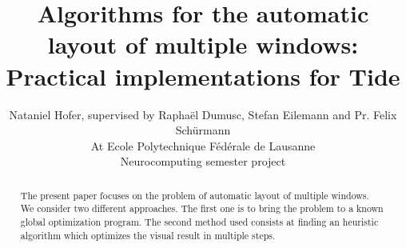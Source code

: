 \documentclass{acmtog}
\begin{document}
\makeatletter
\def\runningfoot{\def\@runningfoot{}}
\def\firstfoot{\def\@firstfoot{}}
\makeatother



\title{Algorithms for the automatic layout of multiple windows: \\Practical implementations for Tide}

\author{Nataniel Hofer, supervised by Raphaël Dumusc, Stefan Eilemann and Pr. Felix Schürmann \\
At Ecole Polytechnique Fédérale de Lausanne\\
Neurocomputing semester project}

\maketitle
\begin{abstract}
The present paper focuses on the problem of automatic layout of multiple windows. We consider two different approaches. The first one is to bring the problem to a known global optimization program. The second method used consists at finding an heuristic algorithm which optimizes the visual result in multiple steps. 
\end{abstract}
\end{document}
